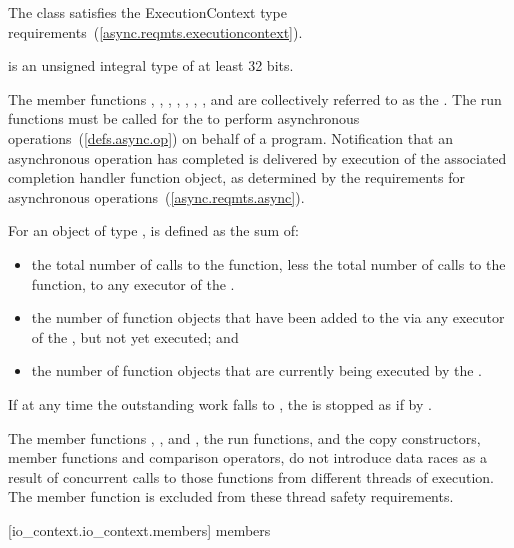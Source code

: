 \pnum
The class  satisfies the ExecutionContext type requirements~(\ref{async.reqmts.executioncontext}).

\pnum
{} is an 
unsigned integral type of at least 32 bits.

\pnum
The  member functions , , , , , , , and  are collectively referred to as the . The run functions must be called for the  to perform asynchronous operations~(\ref{defs.async.op}) on behalf of a \Cpp program. Notification that an asynchronous operation has completed is delivered by execution of the associated completion handler function object, as determined by the requirements for asynchronous operations~(\ref{async.reqmts.async}).

\pnum
For an object of type ,  is defined as the sum of:

\begin{itemize}
\item
the total number of calls to the  function, less the total number of calls to the  function, to any executor of the .
\item
the number of function objects that have been added to the  via any executor of the , but not yet executed; and
\item
the number of function objects that are currently being executed by the .
\end{itemize}

\pnum
If at any time the outstanding work falls to , the  is stopped as if by .

\pnum
The  member functions , , and , the run functions, and the  copy constructors, member functions and comparison operators, do not introduce data races as a result of concurrent calls to those functions from different threads of execution. \enternote The  member function is excluded from these thread safety requirements. \exitnote


[io_context.io_context.members]{ members}


